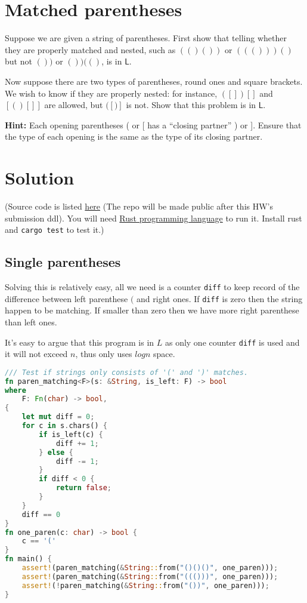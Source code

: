 

\maketitle
\thispagestyle{firststyle}
\vspace{-2.0cm}


\section*{Matched parentheses}
Suppose we are given a string of parentheses.
First show that telling whether they are properly matched and nested,
such as $(()())$ or $((()))()$ but not $())$ or $())(()$,
is in $\mathsf{L}$.

Now suppose there are two types of parentheses, round ones and square brackets.
We wish to know if they are properly nested: for instance,
$([])[]$ and $[()[]]$ are allowed,
but $([)]$ is not.
Show that this problem is in $\mathsf{L}$.

    {\bf Hint:} Each opening parentheses ( or [ has a ``closing partner'' ) or ].
Ensure that the type of each opening is the same as the type of its closing partner.


\section*{Solution}

(Source code is listed \href{https://github.com/DataCorrupted/parentheses-matching}{here}
(The repo will be made public after this HW's submission ddl).
You will need \href{https://www.rust-lang.org/}{Rust programming language} to run it.
Install rust and \lstinline{cargo test} to test it.)

\subsection*{Single parentheses}

Solving this is relatively easy, all we need is a counter \lstinline{diff} to keep record of the difference between left parenthese $($ and right ones.
If \lstinline{diff} is zero then the string happen to be matching.
If smaller than zero then we have more right parenthese than left ones.

It's easy to argue that this program is in $L$ as only one counter \lstinline{diff} is used and it will not exceed $n$, thus only uses $log n$ space.

\begin{lstlisting}[language=Rust]
/// Test if strings only consists of '(' and ')' matches.
fn paren_matching<F>(s: &String, is_left: F) -> bool
where
    F: Fn(char) -> bool,
{
    let mut diff = 0;
    for c in s.chars() {
        if is_left(c) {
            diff += 1;
        } else {
            diff -= 1;
        }
        if diff < 0 {
            return false;
        }
    }
    diff == 0
}
fn one_paren(c: char) -> bool {
    c == '('
}
fn main() {
    assert!(paren_matching(&String::from("()()()", one_paren)));
    assert!(paren_matching(&String::from("((()))", one_paren)));
    assert!(!paren_matching(&String::from("())", one_paren)));
}
\end{lstlisting}

